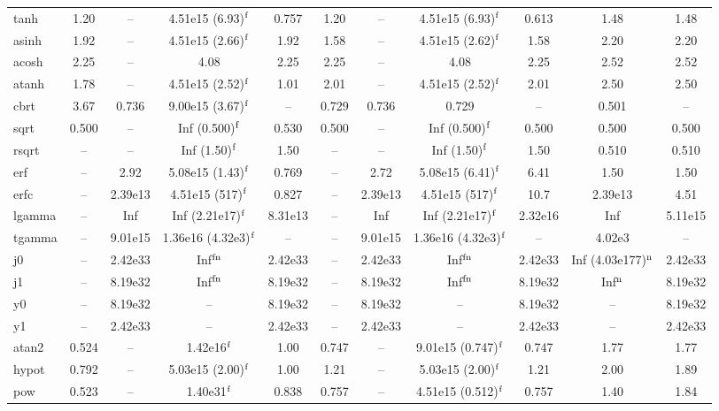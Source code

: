 \begin{table}
\begin{small}
\begin{tabular}{|l|cccc|cccc|cc|}
tanh & 1.20 & -- & 4.51e15 (6.93)$^{\rm f}$ & 0.757 & 1.20 & -- & 4.51e15 (6.93)$^{\rm f}$ & 0.613 & 1.48 & 1.48 \\
asinh & 1.92 & -- & 4.51e15 (2.66)$^{\rm f}$ & 1.92 & 1.58 & -- & 4.51e15 (2.62)$^{\rm f}$ & 1.58 & 2.20 & 2.20 \\
acosh & 2.25 & -- & 4.08 & 2.25 & 2.25 & -- & 4.08 & 2.25 & 2.52 & 2.52 \\
atanh & 1.78 & -- & 4.51e15 (2.52)$^{\rm f}$ & 1.01 & 2.01 & -- & 4.51e15 (2.52)$^{\rm f}$ & 2.01 & 2.50 & 2.50 \\
cbrt & 3.67 & 0.736 & 9.00e15 (3.67)$^{\rm f}$ & -- & 0.729 & 0.736 & 0.729 & -- & 0.501 & -- \\
sqrt & 0.500 & -- & Inf (0.500)$^{\rm f}$ & 0.530 & 0.500 & -- & Inf (0.500)$^{\rm f}$ & 0.500 & 0.500 & 0.500 \\
rsqrt & -- & -- & Inf (1.50)$^{\rm f}$ & 1.50 & -- & -- & Inf (1.50)$^{\rm f}$ & 1.50 & 0.510 & 0.510 \\
erf & -- & 2.92 & 5.08e15 (1.43)$^{\rm f}$ & 0.769 & -- & 2.72 & 5.08e15 (6.41)$^{\rm f}$ & 6.41 & 1.50 & 1.50 \\
erfc & -- & 2.39e13 & 4.51e15 (517)$^{\rm f}$ & 0.827 & -- & 2.39e13 & 4.51e15 (517)$^{\rm f}$ & 10.7 & 2.39e13 & 4.51 \\
lgamma & -- & Inf & Inf (2.21e17)$^{\rm f}$ & 8.31e13 & -- & Inf & Inf (2.21e17)$^{\rm f}$ & 2.32e16 & Inf & 5.11e15 \\
tgamma & -- & 9.01e15 & 1.36e16 (4.32e3)$^{\rm f}$ & -- & -- & 9.01e15 & 1.36e16 (4.32e3)$^{\rm f}$ & -- & 4.02e3 & -- \\
j0 & -- & 2.42e33 & Inf$^{\rm fn}$ & 2.42e33 & -- & 2.42e33 & Inf$^{\rm fn}$ & 2.42e33 & Inf (4.03e177)$^{\rm n}$ & 2.42e33 \\
j1 & -- & 8.19e32 & Inf$^{\rm fn}$ & 8.19e32 & -- & 8.19e32 & Inf$^{\rm fn}$ & 8.19e32 & Inf$^{\rm n}$ & 8.19e32 \\
y0 & -- & 8.19e32 & -- & 8.19e32 & -- & 8.19e32 & -- & 8.19e32 & -- & 8.19e32 \\
y1 & -- & 2.42e33 & -- & 2.42e33 & -- & 2.42e33 & -- & 2.42e33 & -- & 2.42e33 \\
\hline
atan2 & 0.524 & -- & 1.42e16$^{\rm f}$ & 1.00 & 0.747 & -- & 9.01e15 (0.747)$^{\rm f}$ & 0.747 & 1.77 & 1.77 \\
hypot & 0.792 & -- & 5.03e15 (2.00)$^{\rm f}$ & 1.00 & 1.21 & -- & 5.03e15 (2.00)$^{\rm f}$ & 1.21 & 2.00 & 1.89 \\
pow & 0.523 & -- & 1.40e31$^{\rm f}$ & 0.838 & 0.757 & -- & 4.51e15 (0.512)$^{\rm f}$ & 0.757 & 1.40 & 1.84 \\

\end{tabular}
\end{small}
\end{table}
